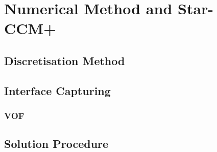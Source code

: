\section{Numerical Method and Star-CCM+}
\subsection{Discretisation Method}
\subsection{Interface Capturing}
\subsubsection{VOF}
\subsection{Solution Procedure}